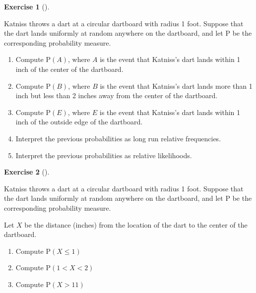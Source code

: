 \documentclass[
  letterpaper,
  DIV=11,
  numbers=noendperiod]{scrreprt}
\providecommand{\tightlist}{%
  \setlength{\itemsep}{0pt}\setlength{\parskip}{0pt}}
\theoremstyle{plain}
\theoremstyle{definition}
\theoremstyle{definition}
\newtheorem{exercise}{Exercise}[chapter]
\theoremstyle{definition}
\theoremstyle{remark}
\begin{document}
\begin{exercise}[]\protect\hypertarget{exr-probspace-dartboard-a}{}\label{exr-probspace-dartboard-a}

Katniss throws a dart at a circular dartboard with radius 1 foot.
Suppose that the dart lands uniformly at random anywhere on the
dartboard, and let \(\textrm{P}\) be the corresponding probability
measure.

\begin{enumerate}
\def\labelenumi{\arabic{enumi}.}
\tightlist
\item
  Compute \(\textrm{P}(A)\), where \(A\) is the event that Katniss's
  dart lands within 1 inch of the center of the dartboard.
\item
  Compute \(\textrm{P}(B)\), where \(B\) is the event that Katniss's
  dart lands more than 1 inch but less than 2 inches away from the
  center of the dartboard.
\item
  Compute \(\textrm{P}(E)\), where \(E\) is the event that Katniss's
  dart lands within 1 inch of the outside edge of the dartboard.
\item
  Interpret the previous probabilities as long run relative frequencies.
\item
  Interpret the previous probabilities as relative likelihoods.
\end{enumerate}

\end{exercise}

\begin{exercise}[]\protect\hypertarget{exr-probspace-dartboard-b}{}\label{exr-probspace-dartboard-b}

Katniss throws a dart at a circular dartboard with radius 1 foot.
Suppose that the dart lands uniformly at random anywhere on the
dartboard, and let \(\textrm{P}\) be the corresponding probability
measure.

Let \(X\) be the distance (inches) from the location of the dart to the
center of the dartboard.

\begin{enumerate}
\def\labelenumi{\arabic{enumi}.}
\tightlist
\item
  Compute \(\textrm{P}(X \le 1)\)
\item
  Compute \(\textrm{P}(1 < X < 2)\)
\item
  Compute \(\textrm{P}(X > 11)\)
\end{enumerate}

\end{exercise}
\end{document}
